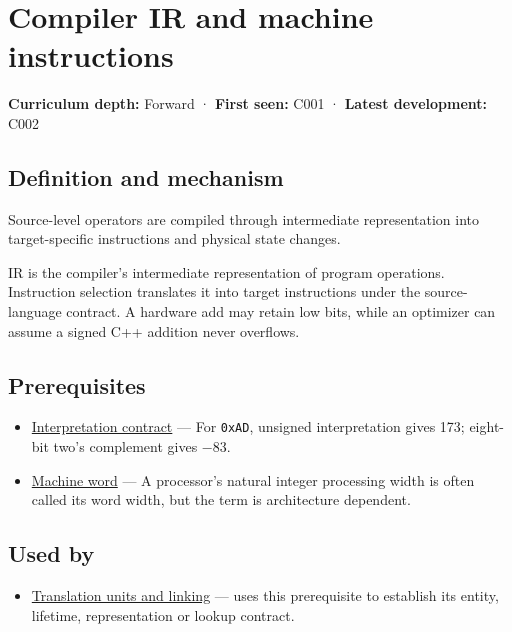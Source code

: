 \hypertarget{appendix-942ad41afb30}{}\label{referencestart:appendix-942ad41afb30}
\section{Compiler IR and machine instructions}\label{appendix-942ad41afb30-compiler-ir-and-machine-instructions}

\textbf{Curriculum depth:} Forward · \textbf{First seen:} C001 · \textbf{Latest development:} C002

\subsection{Definition and mechanism}\label{appendix-942ad41afb30-definition-and-mechanism}

Source-level operators are compiled through intermediate representation into target-specific instructions and physical state changes.

IR is the compiler's intermediate representation of program operations. Instruction selection translates it into target instructions under the source-language contract. A hardware add may retain low bits, while an optimizer can assume a signed C++ addition never overflows.

\subsection{Prerequisites}\label{appendix-942ad41afb30-prerequisites}

\begin{itemize}
\tightlist
\item
  \hyperref[appendix-f414bd4ed05c]{Interpretation contract} --- For \texttt{0xAD}, unsigned interpretation gives 173; eight-bit two's complement gives −83.
\item
  \hyperref[appendix-d67a19507dc5]{Machine word} --- A processor's natural integer processing width is often called its word width, but the term is architecture dependent.
\end{itemize}

\subsection{Used by}\label{appendix-942ad41afb30-used-by}

\begin{itemize}
\tightlist
\item
  \hyperref[appendix-806686359e1b]{Translation units and linking} --- uses this prerequisite to establish its entity, lifetime, representation or lookup contract.
\end{itemize}

